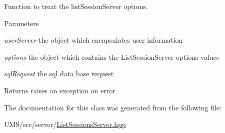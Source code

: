 Function to treat the listSessionServer options. 


\begin{DoxyParams}{Parameters}
\item[{\em userServer}]the object which encapsulates user information \item[{\em options}]the object which contains the ListSessionServer options values \item[{\em sqlRequest}]the sql data base request \end{DoxyParams}
\begin{DoxyReturn}{Returns}
raises an exception on error 
\end{DoxyReturn}


The documentation for this class was generated from the following file:\begin{DoxyCompactItemize}
\item 
UMS/src/server/\hyperlink{ListSessionsServer_8hpp}{ListSessionsServer.hpp}\end{DoxyCompactItemize}
